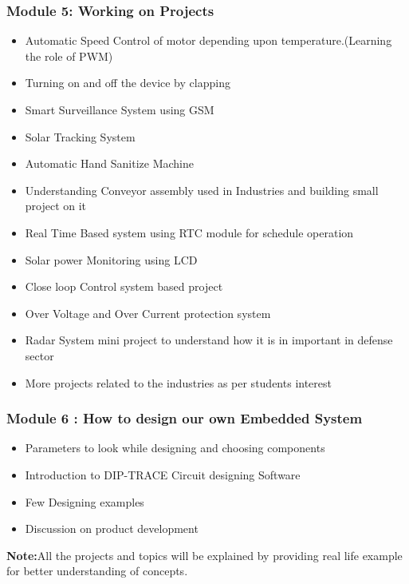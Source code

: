 \documentclass[12pt]{article}
\begin{document}
\subsubsection*{Module 5: Working on Projects}
\begin{itemize}
  \item Automatic Speed Control of motor depending upon temperature.(Learning the role of PWM)
  \item Turning on and off the device by clapping
  \item Smart Surveillance System using GSM 
   \item Solar Tracking System
   \item Automatic Hand Sanitize Machine 
   \item Understanding Conveyor assembly used in Industries and building small project on it
   \item Real Time Based system using RTC module for schedule operation
   \item Solar power Monitoring using LCD
   \item Close loop Control system based project 
   \item Over Voltage and Over Current protection system
   \item Radar System mini project to understand how it is in important in defense sector
   \item More projects related to the industries as per students interest
\end{itemize}

\subsubsection*{Module 6 : How to design our own Embedded System}
\begin{itemize}
  \item Parameters to look while designing and choosing components
  \item Introduction to DIP-TRACE Circuit designing Software
  \item Few Designing examples
   \item Discussion on product development
\end{itemize}

\textbf{Note:}All the projects and topics will be explained by providing real life example for better understanding of concepts.
\end{document}
